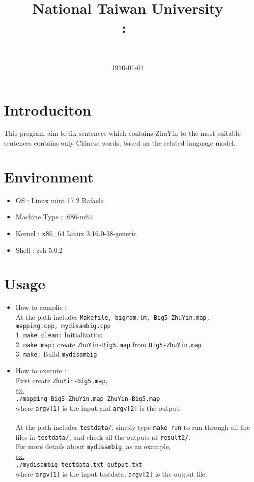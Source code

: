 \documentclass{article}
\title{
{National Taiwan University}\\    
    \textmd{\textbf{\Class:\ \Title}}
}
\author{
	\Department \ \AuthorID \\
	\textbf{\AuthorName}
}
\date{
	\today \\
	\horline{1pt}
}
\newcommand\n{\mbox{\qquad}}
\begin{document}
\maketitle
\section{Introduciton}
\n This program aim to fix sentences which contains ZhuYin to the most suitable sentences contains only Chinese words, based on the related language model.

\section{Environment}
\begin{itemize}
	\item OS : Linux mint 17.2 Rafaela
	\item Machine Type : i686-m64
	\item Kernel : x86\_64 Linux 3.16.0-38-generic
	\item Shell : zsh 5.0.2
\end{itemize}

\section{Usage}
\begin{itemize}
	\item \large{How to complie :} \\
	\normalsize At the path includes \texttt{Makefile, bigram.lm, Big5-ZhuYin.map, mapping.cpp, mydisambig.cpp} \\
		\n 1. \texttt{make clean:} Initialization\\
		\n 2. \texttt{make map:} create \texttt{ZhuYin-Big5.map} from \texttt{Big5-ZhuYin.map} \\
		\n 3. \texttt{make:} Build \texttt{mydisambig}
		
	\item \large{How to execute :} \\
	\normalsize First create \texttt{ZhuYin-Big5.map},\\
	\underline{ex.}\\
	\texttt{./mapping Big5-ZhuYin.map ZhuYin-Big5.map}\\
	where \texttt{argv[1]} is the input and \texttt{argv[2]} is the output.
	\normalsize 
	\\ \\At the path includes \texttt{testdata/}, simply type \texttt{make run} to run through all the files in \texttt{testdata/}, and check all the outputs at \texttt{result2/}. \\
	For more details about \texttt{mydisambig}, as an example, \\
	\underline{ex.}\\
	\n \texttt{./mydisambig testdata.txt output.txt}\\
	where \texttt{argv[1]} is the input testdata, \texttt{argv[2]} is the output file.
\end{itemize}
\end{document}
